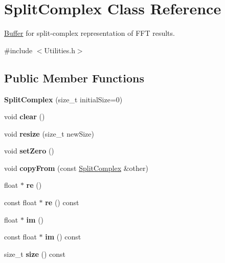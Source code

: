 \hypertarget{class_split_complex}{}\section{Split\+Complex Class Reference}
\label{class_split_complex}


\hyperlink{class_buffer}{Buffer} for split-\/complex representation of F\+FT results.  




{\ttfamily \#include $<$Utilities.\+h$>$}

\subsection*{Public Member Functions}
\begin{DoxyCompactItemize}
\item 
\mbox{\label{class_split_complex_afca2b511432322a15d05a379f6a6a9ef}} 
{\bfseries Split\+Complex} (size\+\_\+t initial\+Size=0)
\item 
\mbox{\label{class_split_complex_a501a62ec88442617e4e0daa42b1fcede}} 
void {\bfseries clear} ()
\item 
\mbox{\label{class_split_complex_adb72d03355456c2c3141f48cf9f6bc4f}} 
void {\bfseries resize} (size\+\_\+t new\+Size)
\item 
\mbox{\label{class_split_complex_a0829fe9158db7653a6b2216ef2b74c46}} 
void {\bfseries set\+Zero} ()
\item 
\mbox{\label{class_split_complex_aaa93253a84f3b9257065012edebd74db}} 
void {\bfseries copy\+From} (const \hyperlink{class_split_complex}{Split\+Complex} \&other)
\item 
\mbox{\label{class_split_complex_ad62376489f93a4f3aab4a6d0693cc38a}} 
float $\ast$ {\bfseries re} ()
\item 
\mbox{\label{class_split_complex_a09716ec8718d1a05aca9b353378b97fa}} 
const float $\ast$ {\bfseries re} () const
\item 
\mbox{\label{class_split_complex_a4c3b2ab8840021abba4c7db7bc4bdf30}} 
float $\ast$ {\bfseries im} ()
\item 
\mbox{\label{class_split_complex_aa2087f6c42335b2ace93d4714ff9ffe9}} 
const float $\ast$ {\bfseries im} () const
\item 
\mbox{\label{class_split_complex_a9fefa9c03a2608dda2dd9971099269e8}} 
size\+\_\+t {\bfseries size} () const
\end{DoxyCompactItemize}


